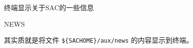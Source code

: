 \label{cmd:news}

终端显示关于SAC的一些信息

\begin{SACSTX}
NEWS
\end{SACSTX}

其实质就是将文件 \verb|${SACHOME}/aux/news| 的内容显示到终端。
